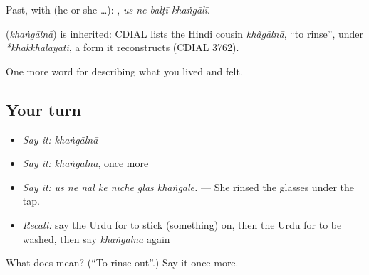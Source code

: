 Past, with  (he or she …):    , \emph{us ne balṭī khaṅgālī}.

\begin{cousinweb}
\textbf{} (\emph{khaṅgālnā}) is inherited: CDIAL lists the Hindi cousin \emph{khãgālnā}, \textquotedblleft{}to rinse\textquotedblright{}, under \emph{*khakkhālayati}, a form it reconstructs (CDIAL 3762).
\end{cousinweb}

\begin{grammarlens}[title={What you've built}]
One more word for describing what you lived and felt.
\end{grammarlens}

\subsection*{Your turn}
\begin{itemize}
\raggedright
  \item \emph{Say it:} \emph{khaṅgālnā}
  \item \emph{Say it:} \emph{khaṅgālnā}, once more
  \item \emph{Say it:} \emph{us ne nal ke nīche glās khaṅgāle.} — She rinsed the glasses under the tap.
  \item \emph{Recall:} say the Urdu for to stick (something) on, then the Urdu for to be washed, then say \emph{khaṅgālnā} again
\end{itemize}

\begin{tcolorbox}[breakable,colback=teal!4,colframe=teal!35!black,title={Before you move on}]
What does  mean? (\textquotedblleft{}To rinse out\textquotedblright{}.) Say it once more.
\end{tcolorbox}
